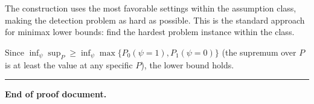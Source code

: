 \documentclass[
  12pt,
]{ctexart}
\begin{document}
The construction uses the most favorable settings within the assumption
class, making the detection problem as hard as possible. This is the
standard approach for minimax lower bounds: find the hardest problem
instance within the class.

Since
\(\inf_\psi \sup_P \geq \inf_\psi \max\{P_0(\psi=1), P_1(\psi=0)\}\)
(the supremum over \(P\) is at least the value at any specific \(P\)),
the lower bound holds.

\begin{center}\rule{0.5\linewidth}{0.5pt}\end{center}

\textbf{End of proof document.}
\end{document}
